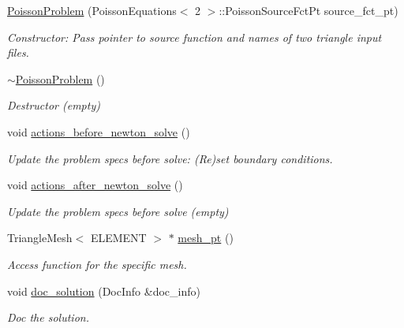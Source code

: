 \begin{DoxyCompactItemize}
\hyperlink{classPoissonProblem_a9c28346c473d246d8f61022365e742ea}{Poisson\+Problem} (Poisson\+Equations$<$ 2 $>$\+::Poisson\+Source\+Fct\+Pt source\+\_\+fct\+\_\+pt)
\begin{DoxyCompactList}\small\item\em Constructor\+: Pass pointer to source function and names of two triangle input files. \end{DoxyCompactList}\item 
\hyperlink{classPoissonProblem_ac247e42d2d292200617f4b9db7ed1ab8}{$\sim$\+Poisson\+Problem} ()
\begin{DoxyCompactList}\small\item\em Destructor (empty) \end{DoxyCompactList}\item 
void \hyperlink{classPoissonProblem_a398608a5ff73b74c5a387b3f794c58df}{actions\+\_\+before\+\_\+newton\+\_\+solve} ()
\begin{DoxyCompactList}\small\item\em Update the problem specs before solve\+: (Re)set boundary conditions. \end{DoxyCompactList}\item 
void \hyperlink{classPoissonProblem_a7a9478d8e1e5c7d3a886b00ab7d50bbd}{actions\+\_\+after\+\_\+newton\+\_\+solve} ()
\begin{DoxyCompactList}\small\item\em Update the problem specs before solve (empty) \end{DoxyCompactList}\item 
Triangle\+Mesh$<$ E\+L\+E\+M\+E\+NT $>$ $\ast$ \hyperlink{classPoissonProblem_ad428aa9392108f968db64534fc23ba86}{mesh\+\_\+pt} ()
\begin{DoxyCompactList}\small\item\em Access function for the specific mesh. \end{DoxyCompactList}\item 
void \hyperlink{classPoissonProblem_aab6f503fa242f687bb8452527bb7688f}{doc\+\_\+solution} (Doc\+Info \&doc\+\_\+info)
\begin{DoxyCompactList}\small\item\em Doc the solution. \end{DoxyCompactList}\end{DoxyCompactItemize}
